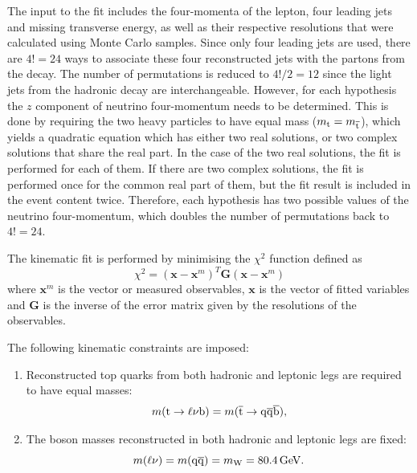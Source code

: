The input to the fit includes the four-momenta of the lepton, four leading jets and missing transverse energy, as well
as their respective resolutions that were calculated using Monte Carlo samples. Since only four leading jets are used,
there are $4!=24$ ways to associate these four reconstructed jets with the partons from the \ttbar decay. The number of
permutations is reduced to $4!/2=12$ since the light jets from the hadronic \W decay are interchangeable. However, for
each hypothesis the $z$ component of neutrino four-momentum needs to be determined. This is done by requiring the two
heavy particles to have equal mass ($m_{\mathrm{t}} = m_{\overline{\mathrm{t}}}$), which yields a quadratic equation which has either two
real solutions, or two complex solutions that share the real part. In the case of the two real solutions, the fit is
performed for each of them. If there are two complex solutions, the fit is performed once for the common real part of
them, but the fit result is included in the event content twice. Therefore, each hypothesis has two possible values of
the neutrino four-momentum, which doubles the number of permutations back to $4!=24$.

The kinematic fit is performed by minimising the $\chi^{2}$ function defined as
\begin{equation}
\chi^{2}  = (\mathbf{x} - \mathbf{x}^{m})^{T}\mathbf{G}(\mathbf{x} - \mathbf{x}^{m})
\end{equation}
where $\mathbf{x}^{m}$ is the vector or measured observables, $\mathbf{x}$ is the vector of fitted variables and
$\mathbf{G}$ is the inverse of the error matrix given by the resolutions of the observables.

The following kinematic constraints are imposed:
\begin{enumerate}[topsep=\parskip, parsep=\parskip, itemsep=\parskip, leftmargin=\leftmargin]
	\item Reconstructed top quarks from both hadronic and leptonic legs are required to have equal masses:
	\begin{equation}
		m(\mathrm{t} \to \ell \nu \mathrm{b}) = m(\overline{\mathrm{t}} \to \mathrm{q}\overline{\mathrm{q}} \overline{\mathrm{b}}),
	\end{equation}
	\item The \W boson masses reconstructed in both hadronic and leptonic legs are fixed:
	\begin{equation}
		m(\ell \nu) = m(\cPq\cPaq) = m_{\W} = \SI{80.4}{\GeV}.
	\end{equation}
\end{enumerate}

